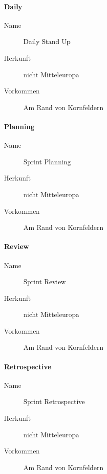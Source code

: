 \paragraph{Daily}
\begin{description}
   \item [Name] Daily Stand Up
   \item [Herkunft] nicht Mitteleuropa
   \item [Vorkommen] Am Rand von Kornfeldern
\end{description}

\paragraph{Planning}
\begin{description}
   \item [Name] Sprint Planning
   \item [Herkunft] nicht Mitteleuropa
   \item [Vorkommen] Am Rand von Kornfeldern
\end{description}

\paragraph{Review}
\begin{description}
   \item [Name] Sprint Review
   \item [Herkunft] nicht Mitteleuropa
   \item [Vorkommen] Am Rand von Kornfeldern
\end{description}

\paragraph{Retrospective}
\begin{description}
   \item [Name] Sprint Retrospective
   \item [Herkunft] nicht Mitteleuropa
   \item [Vorkommen] Am Rand von Kornfeldern
\end{description}
